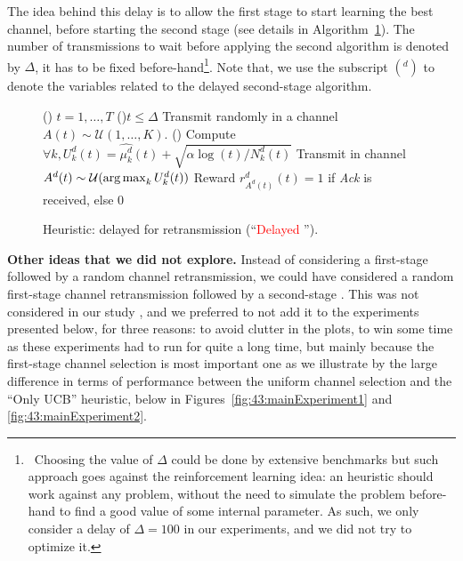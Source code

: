 The idea behind this delay is to allow the first stage \UCB{} to start learning the best channel, before starting the second stage \UCB{} (see details in Algorithm~\ref{algo:43:UCBwithDelay}).
The number of transmissions to wait before applying the second algorithm is denoted by $\Delta$, it has to be fixed before-hand\footnote{~Choosing the value of $\Delta$ could be done by extensive benchmarks but such approach goes against the reinforcement learning idea: an heuristic should work against any problem, without the need to simulate the problem before-hand to find a good value of some internal parameter. As such, we only consider a delay of $\Delta=100$ in our experiments, and we did not try to optimize it.}.
%
Note that, we use the subscript $({}^d)$ to denote the variables
related to the delayed second-stage \UCB{} algorithm.

\begin{figure}[h!]
	\centering
	\begin{framed}
	\begin{algorithm}[H]
		\For()
		{$t = 1, \dots, T$}{
			\uElseIf(){$t \leq \Delta$}{
				Transmit randomly in a channel $A(t) \sim \mathcal{U}(1,\ldots,K)$.
			}
			\Else(){
				Compute $\forall k, U^d_k(t) = \widehat{\mu^d_k}(t) + \sqrt{\alpha \log(t) / N_k^d(t)}$\;
				Transmit in channel $A^d(t) \sim \mathcal{U}(\operatorname*{arg\,max}_k U^d_k(t))$\;
				Reward $r^d_{A^d(t)}(t) = 1$ if \emph{Ack} is received, else $0$\;
			}
		}
		\caption[Heuristic: delayed \UCB{} for retransmission.]{Heuristic: delayed \UCB{} for retransmission (``\textcolor{red}{Delayed \UCB}'').}
		\label{algo:43:UCBwithDelay}
	\end{algorithm}
	\end{framed}
\end{figure}


\textbf{Other ideas that we did not explore.}
%
Instead of considering a first-stage \UCB{} followed by a random channel retransmission, we could have considered a random first-stage channel retransmission followed by a second-stage \UCB.
This was not considered in our study \cite{Bonnefoi2019WCNC}, and we preferred to not add it to the experiments presented below, for three reasons: to avoid clutter in the plots, to win some time as these experiments had to run for quite a long time, but mainly because the first-stage channel selection is most important one as we illustrate by the large difference in terms of performance between the uniform channel selection and the ``Only UCB'' heuristic, below in Figures~\ref{fig:43:mainExperiment1} and \ref{fig:43:mainExperiment2}.


